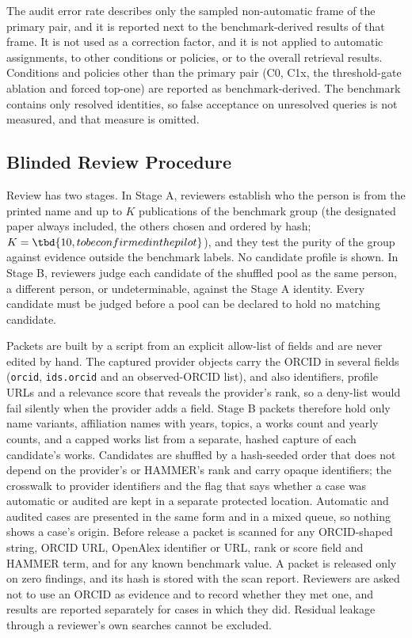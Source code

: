 The audit error rate describes only the sampled non-automatic frame of the primary pair, and it is reported next to the benchmark-derived results of that frame. It is not used as a correction factor, and it is not applied to automatic assignments, to other conditions or policies, or to the overall retrieval results. Conditions and policies other than the primary pair (C0, C1x, the threshold-gate ablation and forced top-one) are reported as benchmark-derived. The benchmark contains only resolved identities, so false acceptance on unresolved queries is not measured, and that measure is omitted.

\subsection{Blinded Review Procedure}
\label{sec:audit}
Review has two stages. In Stage A, reviewers establish who the person is from the printed name and up to $K$ publications of the benchmark group (the designated paper always included, the others chosen and ordered by hash; $K=\tbd{10, to be confirmed in the pilot}$), and they test the purity of the group against evidence outside the benchmark labels. No candidate profile is shown. In Stage B, reviewers judge each candidate of the shuffled pool as the same person, a different person, or undeterminable, against the Stage A identity. Every candidate must be judged before a pool can be declared to hold no matching candidate.

Packets are built by a script from an explicit allow-list of fields and are never edited by hand. The captured provider objects carry the ORCID in several fields (\texttt{orcid}, \texttt{ids.orcid} and an observed-ORCID list), and also identifiers, profile URLs and a relevance score that reveals the provider's rank, so a deny-list would fail silently when the provider adds a field. Stage B packets therefore hold only name variants, affiliation names with years, topics, a works count and yearly counts, and a capped works list from a separate, hashed capture of each candidate's works. Candidates are shuffled by a hash-seeded order that does not depend on the provider's or HAMMER's rank and carry opaque identifiers; the crosswalk to provider identifiers and the flag that says whether a case was automatic or audited are kept in a separate protected location. Automatic and audited cases are presented in the same form and in a mixed queue, so nothing shows a case's origin. Before release a packet is scanned for any ORCID-shaped string, ORCID URL, OpenAlex identifier or URL, rank or score field and HAMMER term, and for any known benchmark value. A packet is released only on zero findings, and its hash is stored with the scan report. Reviewers are asked not to use an ORCID as evidence and to record whether they met one, and results are reported separately for cases in which they did. Residual leakage through a reviewer's own searches cannot be excluded.

